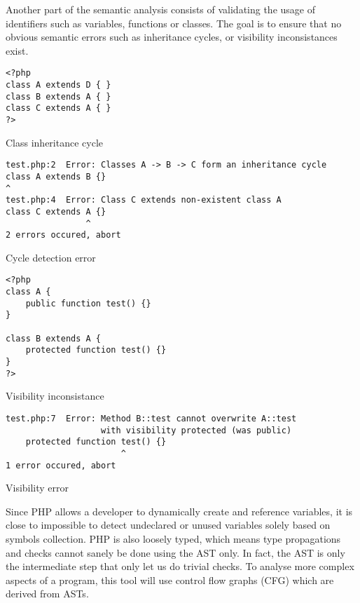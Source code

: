 \documentclass[a4paper]{article}
\begin{document}
Another part of the semantic analysis consists of validating the usage of
identifiers such as variables, functions or classes. The goal is to ensure that
no obvious semantic errors such as inheritance cycles, or visibility
inconsistances exist.

\begin{listing}
  \begin{verbatim}
<?php
class A extends D { } 
class B extends A { }
class C extends A { }
?>
  \end{verbatim}
  \caption{Class inheritance cycle}
\end{listing}

\begin{listing}
  \begin{verbatim}
test.php:2  Error: Classes A -> B -> C form an inheritance cycle
class A extends B {}
^
test.php:4  Error: Class C extends non-existent class A
class C extends A {}
                ^
2 errors occured, abort
  \end{verbatim}
  \caption{Cycle detection error}
\end{listing}

\begin{listing}
  \begin{verbatim}
<?php
class A {
    public function test() {}
}

class B extends A {
    protected function test() {}
}
?>
  \end{verbatim}
  \caption{Visibility inconsistance}
\end{listing}

\begin{listing}
  \begin{verbatim}
test.php:7  Error: Method B::test cannot overwrite A::test 
                   with visibility protected (was public)
    protected function test() {}
                       ^
1 error occured, abort
  \end{verbatim}
  \caption{Visibility error}
\end{listing}

Since PHP allows a developer to dynamically create and reference variables, it
is close to impossible to detect undeclared or unused variables solely based on
symbols collection. PHP is also loosely typed, which means type propagations
and checks cannot sanely be done using the AST only. In fact, the AST is only the
intermediate step that only let us do trivial checks. To analyse more complex
aspects of a program, this tool will use control flow graphs (CFG) which are
derived from ASTs.
\end{document}

